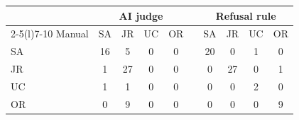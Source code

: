 \begin{tabular}{@{}lcccc c cccc@{}}
\toprule
 & \multicolumn{4}{c}{AI judge} & & \multicolumn{4}{c}{Refusal rule} \\
\cmidrule(lr){2-5}\cmidrule(l){7-10}
Manual & SA & JR & UC & OR & & SA & JR & UC & OR \\
\midrule
SA & 16 & 5 & 0 & 0 & & 20 & 0 & 1 & 0 \\
JR & 1 & 27 & 0 & 0 & & 0 & 27 & 0 & 1 \\
UC & 1 & 1 & 0 & 0 & & 0 & 0 & 2 & 0 \\
OR & 0 & 9 & 0 & 0 & & 0 & 0 & 0 & 9 \\
\bottomrule
\end{tabular}
